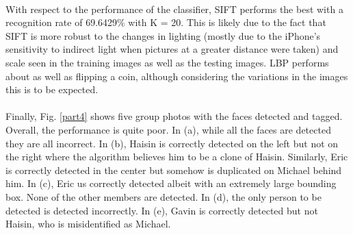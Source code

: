 \documentclass[10pt,letterpaper]{article}
\begin{document}
\paragraph{}
With respect to the performance of the classifier, SIFT performs the best with a recognition rate of  69.6429\% with K = 20.  This is likely due to the fact that SIFT is more robust to the changes in lighting (mostly due to the iPhone's sensitivity to indirect light when pictures at a greater distance were taken) and scale seen in the training images as well as the testing images.  LBP performs about as well as flipping a coin, although considering the variations in the images this is to be expected.
\paragraph{}
Finally, Fig. \ref{part4} shows five group photos with the faces detected and tagged.  Overall, the performance is quite poor.  In (a), while all the faces are detected they are all incorrect.  In (b), Haisin is correctly detected on the left but not on the right where the algorithm believes him to be a clone of Haisin.  Similarly, Eric is correctly detected in the center but somehow is duplicated on Michael behind him.  In (c), Eric us correctly detected albeit with an extremely large bounding box. None of the other members are detected.  In (d), the only person to be detected is detected incorrectly. In (e), Gavin is correctly detected but not Haisin, who is misidentified as Michael.
\end{document}
